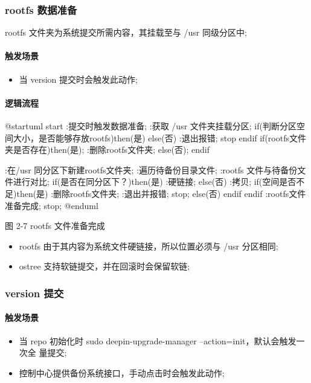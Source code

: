 \documentclass{utart}
\begin{document}
\subsubsection{rootfs 数据准备}
rootfs 文件夹为系统提交所需内容，其挂载至与 /usr 同级分区中;
\paragraph{触发场景}
\begin{itemize}[leftmargin=4em]
  \item 当 version 提交时会触发此动作;
\end{itemize}
\paragraph{逻辑流程}
\begin{center}
  \begin{adjustbox}{scale=0.65}
    \begin{plantuml}
      @startuml
      start
      :提交时触发数据准备;
      :获取 /usr 文件夹挂载分区;
      if(判断分区空间大小，是否能够存放rootfs)then(是)
      else(否)
      :退出报错;
      stop
      endif
      if(rootfs文件夹是否存在)then(是);
      :删除rootfs文件夹;
      else(否);
      endif
      
      :在/usr 同分区下新建rootfs文件夹;
      :遍历待备份目录文件;
      :rootfs 文件与待备份文件进行对比;
      if(是否在同分区下？)then(是)
      :硬链接;
      else(否)
      :拷贝;
      if(空间是否不足)then(是)
      :删除rootfs文件夹;
      :退出并报错;
      stop;
      else(否)
      endif
      endif
      :rootfs文件准备完成;
      stop;
      @enduml
    \end{plantuml}
  \end{adjustbox}

  图 2-7 rootfs 文件准备完成
\end{center}

\begin{itemize}[leftmargin=4em]
  \item rootfs 由于其内容为系统文件硬链接，所以位置必须与 /usr 分区相同;
  \item ostree 支持软链提交，并在回滚时会保留软链;
\end{itemize}

\subsubsection{version 提交}
\paragraph{触发场景}
\begin{itemize}[leftmargin=4em]
  \item 当 repo 初始化时 sudo deepin-upgrade-manager --action=init，默认会触发一次全
  量提交;
  \item 控制中心提供备份系统接口，手动点击时会触发此动作;
\end{itemize}
\end{document}
